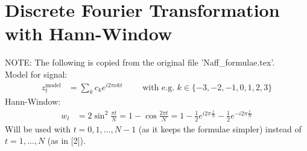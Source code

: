 \documentclass[english, parskip=full]{scrartcl}
\title{\titel}
\date{\today}
\begin{document}
\maketitle  %

\section{Discrete Fourier Transformation with Hann-Window}
NOTE: The following is copied from the original file 'Naff{\_}formulae.tex'.
\\
Model for signal:
\begin{align}
  z^{\text{model}}_t &= \sum_k c_k e^{i 2 \pi \nu k t}
  \qquad \text{ with e.g. }
  k \in \{-3,-2,-1,0,1,2,3\}
  \label{eq_model}
\end{align}
Hann-Window:
\begin{align}
  w_t &= 2 \sin^2 \frac{\pi t}{N} = 1 -\cos \frac{2\pi t}{N}
       = 1 - \frac{1}{2} e^{i 2 \pi \frac{t}{N}} - \frac{1}{2} e^{- i 2 \pi \frac{t}{N}}
\end{align}
Will be used with $t=0,1,\dots,N-1$ (as it keeps the formulae simpler)
instead of $t=1,\dots,N$ (as in [2]).
\end{document}
